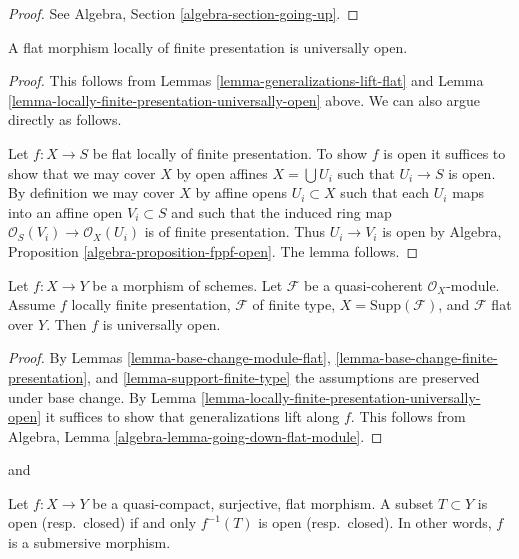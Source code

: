 \begin{proof}
See Algebra, Section \ref{algebra-section-going-up}.
\end{proof}

\begin{lemma}
\label{lemma-fppf-open}
A flat morphism locally of finite presentation is universally open.
\end{lemma}

\begin{proof}
This follows from Lemmas \ref{lemma-generalizations-lift-flat} and
Lemma \ref{lemma-locally-finite-presentation-universally-open} above.
We can also argue directly as follows.

\medskip\noindent
Let $f : X \to S$ be flat locally of finite presentation.
To show $f$ is open it suffices to show that we may cover
$X$ by open affines $X = \bigcup U_i$ such that $U_i \to S$
is open. By definition we may cover $X$ by
affine opens $U_i \subset X$ such that each $U_i$ maps
into an affine open $V_i \subset S$ and such that
the induced ring map $\mathcal{O}_S(V_i) \to \mathcal{O}_X(U_i)$ is
of finite presentation. Thus $U_i \to V_i$ is open by
Algebra, Proposition \ref{algebra-proposition-fppf-open}.
The lemma follows.
\end{proof}

\begin{lemma}
\label{lemma-pf-flat-module-open}
Let $f : X \to Y$ be a morphism of schemes.
Let $\mathcal{F}$ be a quasi-coherent $\mathcal{O}_X$-module.
Assume $f$ locally finite presentation, $\mathcal{F}$ of
finite type, $X = \text{Supp}(\mathcal{F})$, and
$\mathcal{F}$ flat over $Y$. Then $f$ is universally open.
\end{lemma}

\begin{proof}
By Lemmas \ref{lemma-base-change-module-flat},
\ref{lemma-base-change-finite-presentation}, and
\ref{lemma-support-finite-type}
the assumptions are preserved under base change.
By Lemma \ref{lemma-locally-finite-presentation-universally-open}
it suffices to show that generalizations lift along $f$.
This follows from Algebra, Lemma \ref{algebra-lemma-going-down-flat-module}.
\end{proof}

\begin{lemma}
\label{lemma-fpqc-quotient-topology}
\begin{reference}
\cite[Expose VIII, Corollaire 4.3]{SGA1} and
\cite[IV, Corollaire 2.3.12]{EGA}
\end{reference}
Let $f : X \to Y$ be a quasi-compact, surjective, flat morphism.
A subset $T \subset Y$ is open (resp.\ closed) if and only
$f^{-1}(T)$ is open (resp.\ closed). In other words, $f$ is
a submersive morphism.
\end{lemma}

